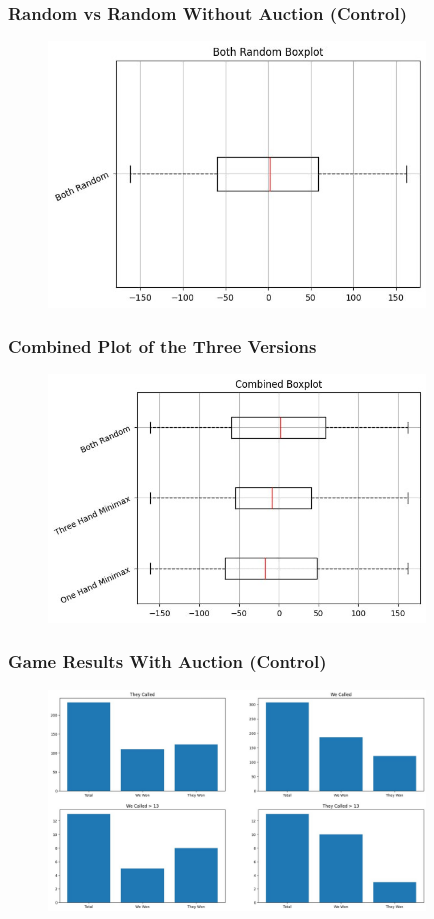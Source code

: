 \documentclass{beamer}
\begin{document}
\begin{frame}\frametitle{Random vs Random Without Auction (Control)}
\begin{center}
        \begin{figure}
	    \includegraphics[width=10cm]{RandomvsRandom.png}
        \end{figure}
\end{center}
\end{frame}

\begin{frame}\frametitle{Combined Plot of the Three Versions}
\begin{center}
        \begin{figure}
	    \includegraphics[width=10cm]{Combined.png}
        \end{figure}
\end{center}
\end{frame}

\begin{frame}\frametitle{Game Results With Auction (Control)}
\begin{center}
        \begin{figure}
	    \includegraphics[width=10cm]{Control.png}
        \end{figure}
\end{center}
\end{frame}
\end{document}
